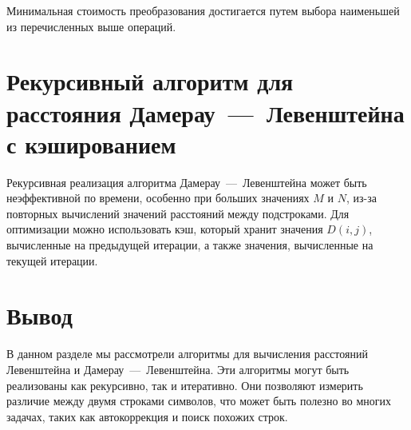 Минимальная стоимость преобразования достигается путем выбора наименьшей из перечисленных выше операций.

\section{Рекурсивный алгоритм для расстояния Дамерау~---~Левенштейна с кэшированием}

Рекурсивная реализация алгоритма Дамерау~---~Левенштейна может быть неэффективной по времени, особенно при больших значениях $M$ и $N$, из-за повторных вычислений значений расстояний между подстроками. 
Для оптимизации можно использовать кэш, который хранит значения $D(i,j)$, вычисленные на предыдущей итерации, а также значения, вычисленные на текущей итерации.

\section*{Вывод}

В данном разделе мы рассмотрели алгоритмы для вычисления расстояний Левенштейна и Дамерау~---~Левенштейна. 
Эти алгоритмы могут быть реализованы как рекурсивно, так и итеративно. 
Они позволяют измерить различие между двумя строками символов, что может быть полезно во многих задачах, таких как автокоррекция и поиск похожих строк.
